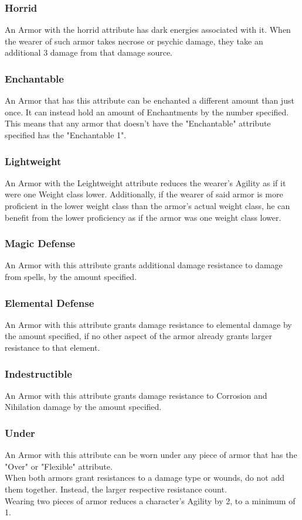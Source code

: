 \subsubsection{Horrid}
An Armor with the horrid attribute has dark energies associated with it. When the wearer of such armor takes necrose or psychic damage, they take an additional 3 damage from that damage source.

\subsubsection{Enchantable}
An Armor that has this attribute can be enchanted a different amount than just once. It can instead hold an amount of Enchantments by the number specified. This means that any armor that doesn't have the "Enchantable" attribute specified has the "Enchantable 1".

\subsubsection{Lightweight}
An Armor with the Leightweight attribute reduces the wearer's Agility as if it were one Weight class lower. Additionally, if the wearer of said armor is more proficient in the lower weight class than the armor's actual weight class, he can benefit from the lower proficiency as if the armor was one weight class lower.

\subsubsection{Magic Defense}
An Armor with this attribute grants additional damage resistance to damage from spells, by the amount specified.

\subsubsection{Elemental Defense}
An Armor with this attribute grants damage resistance to elemental damage by the amount specified, if no other aspect of the armor already grants larger resistance to that element.

\subsubsection{Indestructible}
An Armor with this attribute grants damage resistance to Corrosion and Nihilation damage by the amount specified.

\subsubsection{Under}
An Armor with this attribute can be worn under any piece of armor that has the "Over" or "Flexible" attribute.\\
When both armors grant resistances to a damage type or wounds, do not add them together. Instead, the larger respective resistance count.\\
Wearing two pieces of armor reduces a character's Agility by 2, to a minimum of 1.

